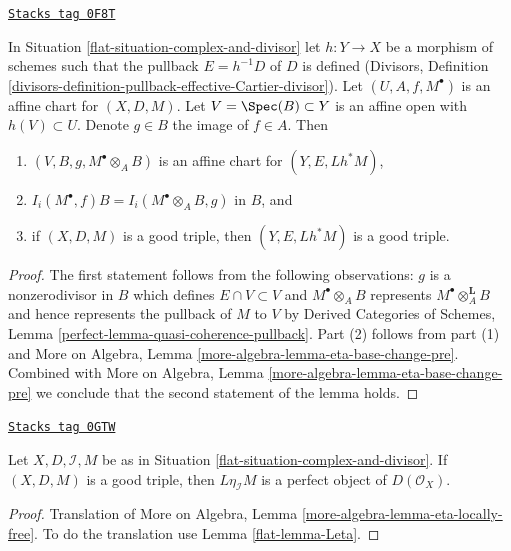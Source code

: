 \begin{lemma}
\label{flat-lemma-pullback-triple-ideals-good}
\href{https://stacks.math.columbia.edu/tag/0F8T}{\texttt{Stacks tag 0F8T}}

In Situation \ref{flat-situation-complex-and-divisor} let $h : Y \to X$ be a
morphism of schemes such that the pullback $E = h^{-1}D$ of $D$
is defined (Divisors, Definition
\ref{divisors-definition-pullback-effective-Cartier-divisor}).
Let $(U, A, f, M^\bullet)$ is an affine chart for $(X, D, M)$.
Let $V = \Spec(B) \subset Y$ is an affine open with $h(V) \subset U$.
Denote $g \in B$ the image of $f \in A$.
Then
\begin{enumerate}
\item $(V, B, g, M^\bullet \otimes_A B)$ is an affine chart for $(Y, E, Lh^*M)$,
\item $I_i(M^\bullet, f)B = I_i(M^\bullet \otimes_A B, g)$ in $B$, and
\item if $(X, D, M)$ is a good triple, then
$(Y, E, Lh^*M)$ is a good triple.
\end{enumerate}
\end{lemma}

\begin{proof}
The first statement follows from the following observations:
$g$ is a nonzerodivisor in $B$ which defines $E \cap V \subset V$
and $M^\bullet \otimes_A B$ represents $M^\bullet \otimes_A^\mathbf{L} B$
and hence represents the pullback of $M$ to $V$ by
Derived Categories of Schemes, Lemma
\ref{perfect-lemma-quasi-coherence-pullback}.
Part (2) follows from part (1) and
More on Algebra, Lemma \ref{more-algebra-lemma-eta-base-change-pre}.
Combined with
More on Algebra, Lemma \ref{more-algebra-lemma-eta-base-change-pre}
we conclude that the second statement of the lemma holds.
\end{proof}

\begin{lemma}
\label{flat-lemma-good-triple}
\href{https://stacks.math.columbia.edu/tag/0GTW}{\texttt{Stacks tag 0GTW}}

Let $X, D, \mathcal{I}, M$ be as in
Situation \ref{flat-situation-complex-and-divisor}.
If $(X, D, M)$ is a good triple, then
$L\eta_\mathcal{I}M$ is a perfect object
of $D(\mathcal{O}_X)$.
\end{lemma}

\begin{proof}

Translation of
More on Algebra, Lemma \ref{more-algebra-lemma-eta-locally-free}.
To do the translation use Lemma \ref{flat-lemma-Leta}.
\end{proof}

